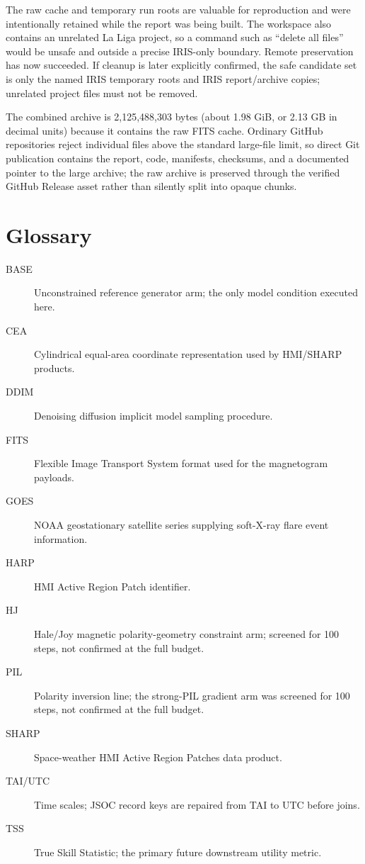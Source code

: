 \documentclass[11pt,oneside]{report}
\begin{document}
The raw cache and temporary run roots are valuable for reproduction and were intentionally retained while the report was being built. The workspace also contains an unrelated La Liga project, so a command such as ``delete all files'' would be unsafe and outside a precise IRIS-only boundary. Remote preservation has now succeeded. If cleanup is later explicitly confirmed, the safe candidate set is only the named IRIS temporary roots and IRIS report/archive copies; unrelated project files must not be removed.

The combined archive is 2,125,488,303 bytes (about 1.98 GiB, or 2.13 GB in decimal units) because it contains the raw FITS cache. Ordinary GitHub repositories reject individual files above the standard large-file limit, so direct Git publication contains the report, code, manifests, checksums, and a documented pointer to the large archive; the raw archive is preserved through the verified GitHub Release asset rather than silently split into opaque chunks.

\chapter{Glossary}

\begin{description}
\item[BASE] Unconstrained reference generator arm; the only model condition executed here.
\item[CEA] Cylindrical equal-area coordinate representation used by HMI/SHARP products.
\item[DDIM] Denoising diffusion implicit model sampling procedure.
\item[FITS] Flexible Image Transport System format used for the magnetogram payloads.
\item[GOES] NOAA geostationary satellite series supplying soft-X-ray flare event information.
\item[HARP] HMI Active Region Patch identifier.
\item[HJ] Hale/Joy magnetic polarity-geometry constraint arm; screened for 100 steps, not confirmed at the full budget.
\item[PIL] Polarity inversion line; the strong-PIL gradient arm was screened for 100 steps, not confirmed at the full budget.
\item[SHARP] Space-weather HMI Active Region Patches data product.
\item[TAI/UTC] Time scales; JSOC record keys are repaired from TAI to UTC before joins.
\item[TSS] True Skill Statistic; the primary future downstream utility metric.
\end{description}
\end{document}
